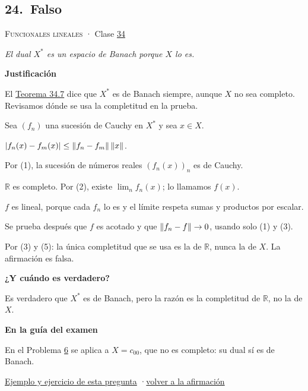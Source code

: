 \documentclass[11pt,a4paper]{article}
\newcommand{\R}{\mathbb{R}}\newcommand{\N}{\mathbb{N}}\newcommand{\Q}{\mathbb{Q}}
\newcommand{\bloque}[1]{\par\smallskip\noindent\textbf{\color{acento}#1}\par}
\begin{document}
\subsection*{\hypertarget{r-24}{}24.\ \textcolor{bad}{Falso}}
{\small \textsc{Funcionales lineales} · Clase \href{https://decostruttivismo.github.io/MAT2514-repaso/pdf/MAT2514_apuntes_completos.pdf\#nameddest=section.34}{34}}\par
\emph{El dual $X^*$ es un espacio de Banach porque $X$ lo es.}
\bloque{Justificación}
\begin{pasos}
\item[] El \href{https://decostruttivismo.github.io/MAT2514-repaso/pdf/MAT2514_apuntes_completos.pdf\#nameddest=teorema.34.7}{Teorema 34.7} dice que $X^*$ es de Banach siempre, aunque $X$ no sea completo. Revisamos dónde se usa la completitud en la prueba.
\item[] Sea $(f_n)$ una sucesión de Cauchy en $X^*$ y sea $x\in X$.
\item[(1)] $\lvert f_n(x)-f_m(x)\rvert\le\lVert f_n-f_m\rVert\,\lVert x\rVert$.
\item[(2)] Por (1), la sucesión de números reales $(f_n(x))_n$ es de Cauchy.
\item[(3)] $\R$ es completo. Por (2), existe $\lim_nf_n(x)$; lo llamamos $f(x)$.
\item[(4)] $f$ es lineal, porque cada $f_n$ lo es y el límite respeta sumas y productos por escalar.
\item[(5)] Se prueba después que $f$ es acotado y que $\lVert f_n-f\rVert\to0$, usando solo (1) y (3).
\item[] Por (3) y (5): la única completitud que se usa es la de $\R$, nunca la de $X$. La afirmación es falsa.
\end{pasos}
\bloque{¿Y cuándo es verdadero?}
\begin{pasos}
\item[] Es verdadero que $X^*$ es de Banach, pero la razón es la completitud de $\R$, no la de $X$.
\end{pasos}
\bloque{En la guía del examen}
\begin{pasos}
\item[] En el Problema \hyperlink{prob-6}{6} se aplica a $X=c_{00}$, que no es completo: su dual sí es de Banach.
\end{pasos}
\par{}
\par{\small \hyperlink{e-24}{Ejemplo y ejercicio de esta pregunta} \quad·\quad \hyperlink{q-24}{volver a la afirmación}}
\end{document}
